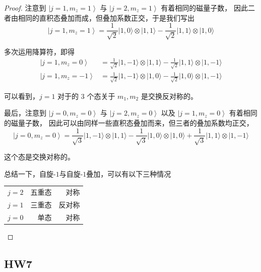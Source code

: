 \begin{proof}
注意到 $\left|j=1, m_{z}=1\right\rangle$ 与 $\left|j=2, m_{z}=1\right\rangle$ 有着相同的磁量子数，
因此二者由相同的直积态叠加而成，但叠加系数正交，于是我们写出
$$\left|j=1, m_{z}=1\right\rangle
=\frac{1}{\sqrt{2}}|1,0\rangle \otimes|1,1\rangle-\frac{1}{\sqrt{2}}|1,1\rangle \otimes|1,0\rangle$$

多次运用降算符，即得
$$\begin{aligned}
\left|j=1, m_{z}=0\right\rangle&=\frac{1}{\sqrt{2}}|1,-1\rangle \otimes|1,1\rangle-\frac{1}{\sqrt{2}}|1,1\rangle \otimes|1,-1\rangle \\
\left|j=1, m_{z}=-1\right\rangle&=\frac{1}{\sqrt{2}}|1,-1\rangle \otimes|1,0\rangle-\frac{1}{\sqrt{2}}|1,0\rangle \otimes|1,-1\rangle
\end{aligned}$$

可以看到，$j=1$ 对于的 $3$ 个态关于 $m_{1}, m_{2}$ 是交换反对称的。

最后，注意到 $\left|j=0, m_{z}=0\right\rangle$ 与 $\left|j=2, m_{z}=0\right\rangle$ 以及 $\left|j=1, m_{z}=0\right\rangle$ 有着相同的磁量子数，
因此可以由同样一些直积态叠加而来，但三者的叠加系数均正交，
$$\left|j=0, m_{z}=0\right\rangle=\frac{1}{\sqrt{3}}|1,-1\rangle \otimes|1,1\rangle-\frac{1}{\sqrt{3}}|1,0\rangle \otimes|1,0\rangle+\frac{1}{\sqrt{3}}|1,1\rangle \otimes|1,-1\rangle$$

这个态是交换对称的。

总结一下，自旋-$1$与自旋-$1$叠加，可以有以下三种情况
\begin{center}\begin{tabular}{lrr}
$j=2$ & 五重态 & 对称 \\
$j=1$ & 三重态 & 反对称 \\
$j=0$ & 单态 & 对称
\end{tabular}\end{center}
\end{proof}


\subsection{HW7}

